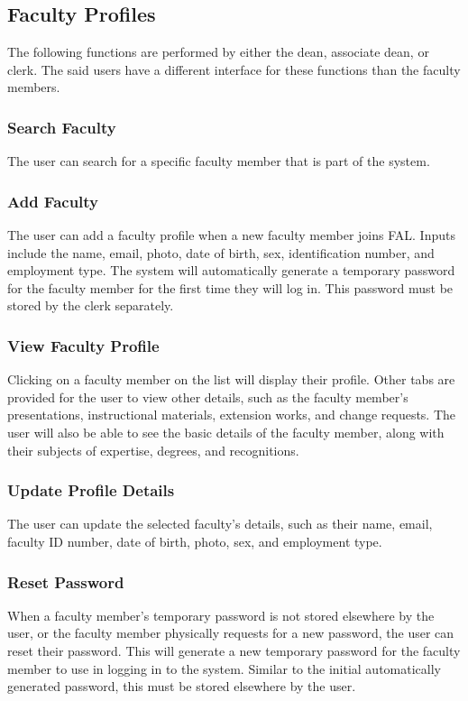     \subsection{Faculty Profiles}
    The following functions are performed by either the dean, associate dean, or clerk. The said users have a different interface for these functions than the faculty members.
    
        \subsubsection{Search Faculty}
        The user can search for a specific faculty member that is part of the system.
    
    	\subsubsection{Add Faculty}
    	The user can add a faculty profile when a new faculty member joins FAL. Inputs include the name, email, photo, date of birth, sex, identification number, and employment type. The system will automatically generate a temporary password for the faculty member for the first time they will log in. This password must be stored by the clerk separately.
    	
    	\subsubsection{View Faculty Profile}
    	Clicking on a faculty member on the list will display their profile. Other tabs are provided for the user to view other details, such as the faculty member's presentations, instructional materials, extension works, and change requests. The user will also be able to see the basic details of the faculty member, along with their subjects of expertise, degrees, and recognitions.
    	
    	\subsubsection{Update Profile Details}
    	The user can update the selected faculty's details, such as their name, email, faculty ID number, date of birth, photo, sex, and employment type.
    	
    	\subsubsection{Reset Password}
    	When a faculty member's temporary password is not stored elsewhere by the user, or the faculty member physically requests for a new password, the user can reset their password. This will generate a new temporary password for the faculty member to use in logging in to the system. Similar to the initial automatically generated password, this must be stored elsewhere by the user.
    	
